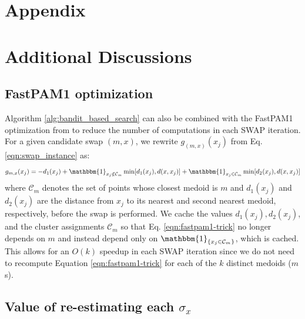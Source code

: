 
\clearpage
\section*{Appendix}
\label{appendix}

\renewcommand\thefigure{\arabic{figure}}
\setcounter{figure}{1}      
\setcounter{section}{0}      

\renewcommand{\figurename}{Appendix Figure}

\section{Additional Discussions}
\subsection{FastPAM1 optimization}
\label{A2}

Algorithm \ref{alg:bandit_based_search} can also be combined with the FastPAM1 optimization from \cite{schubert2019faster} to reduce the number of computations in each SWAP iteration. 
For a given candidate swap $(m, x)$, we rewrite $g_{(m,x)}(x_j)$ from Eq. \eqref{eqn:swap_instance} as:
\begin{equation}
    \label{eqn:fastpam1-trick}
    g_{m,x}(x_j) = - d_1(x_j) + \mathbbm{1}_{x_j \notin \mathcal{C}_m}\min[d_1(x_j),d(x,x_j)] + \mathbbm{1}_{x_j \in \mathcal{C}_m}\min[d_2(x_j), d(x, x_j)]
\end{equation}
where $\mathcal{C}_m$ denotes the set of points whose closest medoid is $m$ and $d_1(x_j)$ and $d_2(x_j)$ are the distance from $x_j$ to its nearest and second nearest medoid, respectively, before the swap is performed. 
We cache the values $d_1(x_j), d_2(x_j)$, and the cluster assignments $\mathcal{C}_m$ so that Eq. \eqref{eqn:fastpam1-trick} no longer depends on $m$ and instead depend only on $\mathbbm{1}_{\{x_j \in \mathcal{C}_m \}}$, which is cached. This allows for an $O(k)$ speedup in each SWAP iteration since we do not need to recompute Equation \ref{eqn:fastpam1-trick} for each of the $k$ distinct medoids ($m$s).


\subsection{Value of re-estimating each \texorpdfstring{$\sigma_x$}{Lg}}
\label{A1}



